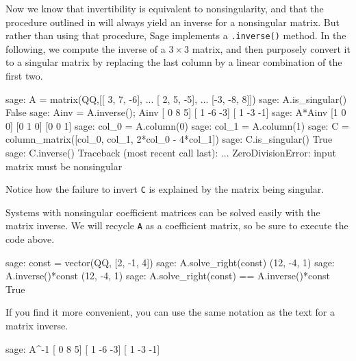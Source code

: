 Now we know that invertibility is equivalent to nonsingularity, and that the procedure outlined in  will always yield an inverse for a nonsingular matrix.  But rather than using that procedure, Sage implements a \verb?.inverse()? method.  In the following, we compute the inverse of a $3\times 3$ matrix, and then purposely convert it to a singular matrix by replacing the last column by a linear combination of the first two.
%
\begin{sageexample}
sage: A = matrix(QQ,[[ 3,  7, -6],
...                  [ 2,  5, -5],
...                  [-3, -8,  8]])
sage: A.is_singular()
False
sage: Ainv = A.inverse(); Ainv
[ 0  8  5]
[ 1 -6 -3]
[ 1 -3 -1]
sage: A*Ainv
[1 0 0]
[0 1 0]
[0 0 1]
sage: col_0 = A.column(0)
sage: col_1 = A.column(1)
sage: C = column_matrix([col_0, col_1, 2*col_0 - 4*col_1])
sage: C.is_singular()
True
sage: C.inverse()
Traceback (most recent call last):
...
ZeroDivisionError: input matrix must be nonsingular
\end{sageexample}
%
Notice how the failure to invert \verb?C? is explained by the matrix being singular.\par
%
Systems with nonsingular coefficient matrices can be solved easily with the matrix inverse.  We will recycle \verb?A? as a coefficient matrix, so be sure to execute the code above.
%
\begin{sageexample}
sage: const = vector(QQ, [2, -1, 4])
sage: A.solve_right(const)
(12, -4, 1)
sage: A.inverse()*const
(12, -4, 1)
sage: A.solve_right(const) == A.inverse()*const
True
\end{sageexample}
%
If you find it more convenient, you can use the same notation as the text for a matrix inverse.
%
\begin{sageexample}
sage: A^-1
[ 0  8  5]
[ 1 -6 -3]
[ 1 -3 -1]
\end{sageexample}
%
\begin{sageverbatim}
\end{sageverbatim}
%

